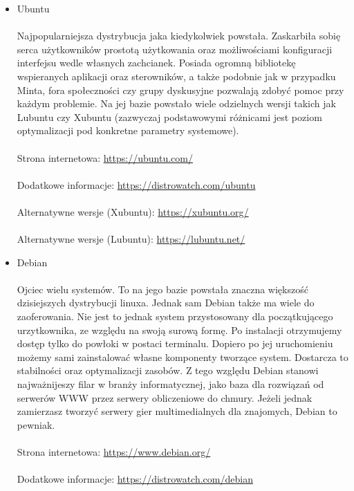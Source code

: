 \documentclass[10pt,a4paper]{report}
\begin{document}
\begin{itemize}
\item {\Huge Ubuntu \\\\} Najpopularniejsza dystrybucja jaka kiedykolwiek powstała. Zaskarbiła sobię serca użytkowników prostotą użytkowania oraz możliwościami konfiguracji interfejsu wedle własnych zachcianek. Posiada ogromną bibliotekę wspieranych aplikacji oraz sterowników, a także podobnie jak w przypadku Minta, fora społeczności czy grupy dyskusyjne pozwalają zdobyć pomoc przy każdym problemie. Na jej bazie powstało wiele odzielnych wersji takich jak Lubuntu czy Xubuntu (zazwyczaj podstawowymi różnicami jest poziom optymalizacji pod konkretne parametry systemowe).\\\\Strona internetowa: \url{https://ubuntu.com/}\\\\Dodatkowe informacje: \href{https://distrowatch.com/table.php?distribution=ubuntu}{https://distrowatch.com/ubuntu}\\\\ Alternatywne wersje (Xubuntu): \url{https://xubuntu.org/}\\\\ Alternatywne wersje (Lubuntu): \url{https://lubuntu.net/}
\item {\Huge Debian \\\\}Ojciec wielu systemów. To na jego bazie powstała znaczna większość dzisiejszych dystrybucji linuxa. Jednak sam Debian także ma wiele do zaoferowania. Nie jest to jednak system przystosowany dla początkującego urzytkownika, ze względu na swoją surową formę. Po instalacji otrzymujemy dostęp tylko do powłoki w postaci terminalu. Dopiero po jej uruchomieniu możemy sami zainstalować własne komponenty tworzące system. Dostarcza to stabilności oraz optymalizacji zasobów. Z tego względu Debian stanowi najważnijeszy filar w branży informatycznej, jako baza dla rozwiązań od serwerów WWW przez serwery obliczeniowe do chmury. Jeżeli jednak zamierzasz tworzyć serwery gier multimedialnych dla znajomych, Debian to pewniak.\\\\ Strona internetowa: \url{https://www.debian.org/}\\\\ Dodatkowe informacje: \href{https://distrowatch.com/table.php?distribution=debian}{https://distrowatch.com/debian}

\end{itemize}
\end{document}

